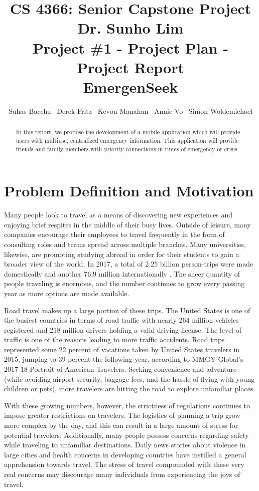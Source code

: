 \documentclass[10pt]{report}
\title{CS 4366: Senior Capstone Project \\ Dr. Sunho Lim \\ Project \#1 - Project Plan - Project Report \\ EmergenSeek}
\author{Suhas Bacchu \ Derek Fritz \ Kevon Manahan \ Annie Vo \ Simon Woldemichael}
\begin{document}
\maketitle

\begin{abstract}
In this report, we propose the development of a mobile application which will provide users with multiuse, centralized emergency information. This application will provide friends and family members with priority connections in times of emergency or crisis
\end{abstract}
\section{Problem Definition and Motivation}
Many people look to travel as a means of discovering new experiences and enjoying brief respites in the middle of their busy lives. Outside of leisure, many companies encourage their employees to travel frequently in the form of consulting roles and teams spread across multiple branches. Many universities, likewise, are promoting studying abroad in order for their students to gain a broader view of the world. In 2017, a total of 2.25 billion person-trips were made domestically and another 76.9 million internationally \cite{one}. The sheer quantity of people traveling is enormous, and the number continues to grow every passing year as more options are made available.

Road travel makes up a large portion of these trips. The United States is one of the busiest countries in terms of road traffic with nearly 264 million vehicles registered and 218 million drivers holding a valid driving license. The level of traffic is one of the reasons leading to more traffic accidents. Road trips represented some 22 percent of vacations taken by United States travelers in 2015, jumping to 39 percent the following year, according to MMGY Global’s 2017-18 Portrait of American Travelers. Seeking convenience and adventure (while avoiding airport security, baggage fees, and the hassle of flying with young children or pets), more travelers are hitting the road to explore unfamiliar places.

With these growing numbers, however, the strictness of regulations continues to impose greater restrictions on travelers. The logistics of planning a trip grow more complex by the day, and this can result in a large amount of stress for potential travelers. Additionally, many people possess concerns regarding safety while traveling to unfamiliar destinations. Daily news stories about violence in large cities and health concerns in developing countries have instilled a general apprehension towards travel. The stress of travel compounded with these very real concerns may discourage many individuals from experiencing the joys of travel.
\end{document}
